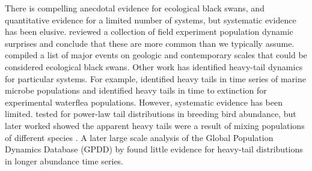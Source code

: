 There is compelling anecdotal evidence for ecological black swans, and
quantitative evidence for a limited number of systems, but systematic evidence
has been elusive. \citet{doak2008} reviewed a collection of field experiment
population dynamic surprises and conclude that these are more common than we
typically assume. \citet{nunez2012} compiled a list of major events on geologic
and contemporary scales that could be considered ecological black swans. Other
work has identified heavy-tail dynamics for particular systems. For example,
\citet{segura2013} identified heavy tails in time series of marine microbe
populations and \citet{drake2014} identified heavy tails in time to extinction
for experimental waterflea populations. However, systematic evidence has been
limited. \citet{keitt1998} tested for power-law tail distributions in breeding
bird abundance, but later worked showed the apparent heavy tails were a result
of mixing populations of different species \citep{allen2001}. A later large
scale analysis of the Global Population Dynamics Database (GPDD) by
\citet{halley2002} found little evidence for heavy-tail distributions in longer
abundance time series.



